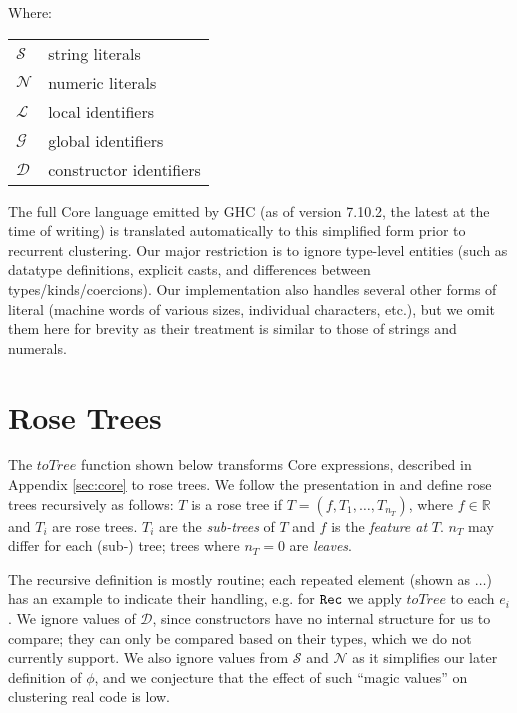 Where:
\begin{tabular}[t]{l @{ $=$ } l}
  $\mathcal{S}$ & string literals    \\
  $\mathcal{N}$ & numeric literals   \\
  $\mathcal{L}$ & local identifiers  \\
  $\mathcal{G}$ & global identifiers \\
  $\mathcal{D}$ & constructor identifiers
\end{tabular}

The full Core language emitted by GHC (as of version 7.10.2, the latest at the time of writing) is translated automatically to this simplified form prior to recurrent clustering. Our major restriction is to ignore type-level entities (such as datatype definitions, explicit casts, and differences between types/kinds/coercions). Our implementation also handles several other forms of literal (machine words of various sizes, individual characters, etc.), but we omit them here for brevity as their treatment is similar to those of strings and numerals.

\section{Rose Trees}\label{sec:rosetree}

The $toTree$ function shown below transforms Core expressions, described in Appendix \ref{sec:core} to rose trees. We follow the presentation in \cite{blundell2012bayesian} and define rose trees recursively as follows: $T$ is a rose tree if $T = (f, T_1, \dots, T_{n_T})$, where $f \in \mathbb{R}$ and $T_i$ are rose trees. $T_i$ are the \emph{sub-trees} of $T$ and $f$ is the \emph{feature at} $T$. $n_T$ may differ for each (sub-) tree; trees where $n_T = 0$ are \emph{leaves}.

The recursive definition is mostly routine; each repeated element (shown as $\dots$) has an example to indicate their handling, e.g. for $\texttt{Rec}$ we apply $toTree$ to each $e_i$. We ignore values of $\mathcal{D}$, since constructors have no internal structure for us to compare; they can only be compared based on their types, which we do not currently support. We also ignore values from $\mathcal{S}$ and $\mathcal{N}$ as it simplifies our later definition of $\phi$, and we conjecture that the effect of such ``magic values'' on clustering real code is low.

